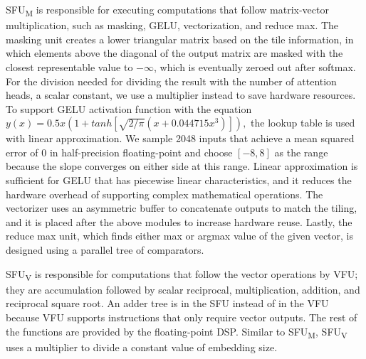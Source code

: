 SFU\textsubscript{M} is responsible for executing computations that follow matrix-vector multiplication, such as 
masking, GELU, vectorization, and reduce max. The masking unit creates a lower triangular matrix based on the tile information, in which elements above the diagonal of the output matrix are masked with the closest representable value to $-\infty$, which is eventually zeroed out after softmax. For the division needed for dividing the result with the number of attention heads, a scalar constant, we use a multiplier instead to save hardware resources. To support GELU activation function with the equation $y(x)=0.5x(1+tanh[\sqrt{2/\pi}(x+0.044715x^3)]),$ the lookup table is used with linear approximation. We sample 2048 inputs that achieve a mean squared error of 0 in half-precision floating-point and choose $[-8, 8]$ as the range because the slope converges on either side at this range. Linear approximation is sufficient for GELU that has piecewise linear characteristics, and it reduces the hardware overhead of supporting complex mathematical operations. The vectorizer uses an asymmetric buffer to concatenate outputs to match the tiling, and it is placed after the above modules to increase hardware reuse. Lastly, the reduce max unit, which finds either max or argmax value of the given vector, is designed using a parallel tree of comparators.


SFU\textsubscript{V} is responsible for computations that follow the vector operations by VFU;
they are accumulation followed by scalar reciprocal, multiplication, addition, and reciprocal square root. An adder tree is in the SFU instead of in the VFU because VFU supports instructions that only require vector outputs. The rest of the functions are provided by the floating-point DSP. Similar to SFU\textsubscript{M}, SFU\textsubscript{V} uses a multiplier to divide a constant value of embedding size.

